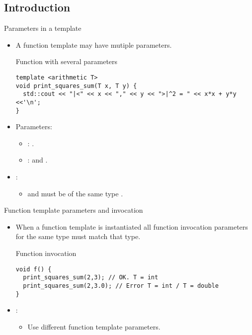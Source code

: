 \subsection{Introduction}

\begin{frame}[t,fragile]{Parameters in a template}
\begin{itemize}
  \item A function template may have mutiple parameters.

\begin{block}{Function with several parameters}
\begin{lstlisting}
template <arithmetic T>
void print_squares_sum(T x, T y) {
  std::cout << "|<" << x << "," << y << ">|^2 = " << x*x + y*y <<'\n';
}
\end{lstlisting}
\end{block}

  \item Parameters:
    \begin{itemize}
      \item {}: .
      \item {}:  and .
    \end{itemize}

  \item {}:
    \begin{itemize}
      \item {} and  must be of the same type .
    \end{itemize}

\end{itemize}
\end{frame}

\begin{frame}[t,fragile]{Function template parameters and invocation}
\begin{itemize}
  \item When a function template is instantiated all function invocation parameters
        for the same type must match that type.

\begin{block}{Function invocation}
\begin{lstlisting}
void f() {
  print_squares_sum(2,3); // OK. T = int
  print_squares_sum(2,3.0); // Error T = int / T = double
}
\end{lstlisting}
\end{block}

  \item {}:
    \begin{itemize}
      \item Use different function template parameters.
    \end{itemize}
\end{itemize}
\end{frame}
